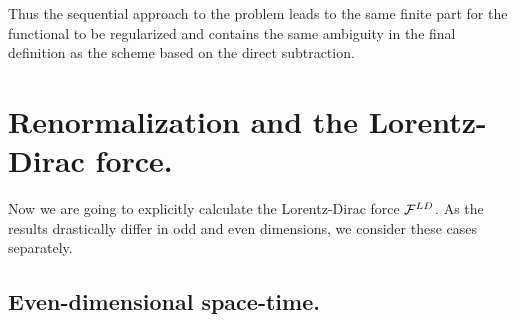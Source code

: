 \documentclass[a4paper,12pt]{article}
\begin{document}
Thus the sequential approach to the problem leads to the same finite part
for the functional to be regularized and contains the same ambiguity in the
final definition as the scheme based on the direct subtraction.

\section{ Renormalization and the Lorentz-Dirac force.}

Now we are going to explicitly calculate the Lorentz-Dirac force ${\cal F}%
^{LD}$. As the results drastically differ in odd and even dimensions,
we consider these cases separately.

\subsection{ Even-dimensional space-time.}
\end{document}
